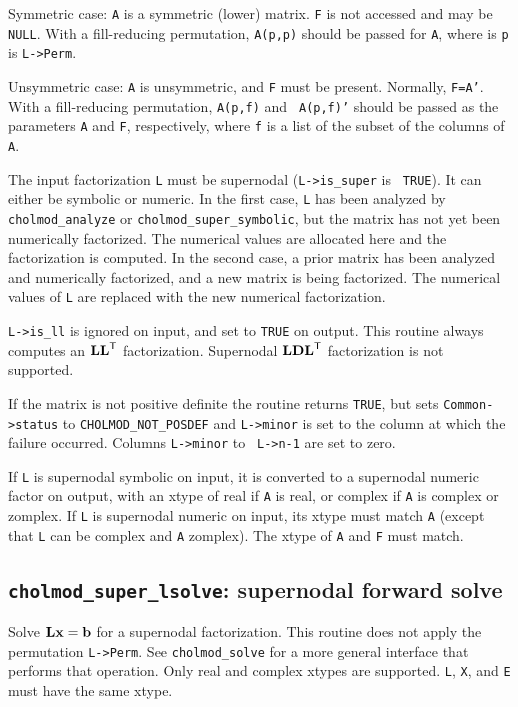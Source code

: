 \documentclass[11pt]{article}
\newcommand{\m}[1]{{\bf{#1}}}       %
\newcommand{\tr}{^{\sf T}}          %
\begin{document}
Symmetric case: {\tt A} is a symmetric (lower) matrix.  {\tt F} is not accessed
and may be {\tt NULL}.  With a fill-reducing permutation, {\tt A(p,p)} should
be passed for {\tt A}, where is {\tt p} is {\tt L->Perm}.

Unsymmetric case: {\tt A} is unsymmetric, and {\tt F} must be present.
Normally, {\tt F=A'}.  With a fill-reducing permutation, {\tt A(p,f)} and {\tt
A(p,f)'} should be passed as the parameters {\tt A} and {\tt F}, respectively,
where {\tt f} is a list of the subset of the columns of {\tt A}.

The input factorization {\tt L} must be supernodal ({\tt L->is\_super} is {\tt
TRUE}).  It can either be symbolic or numeric.  In the first case, {\tt L} has
been analyzed by {\tt cholmod\_analyze} or {\tt cholmod\_super\_symbolic}, but
the matrix has not yet been numerically factorized.  The numerical values are
allocated here and the factorization is computed.  In the second case, a prior
matrix has been analyzed and numerically factorized, and a new matrix is being
factorized.  The numerical values of {\tt L} are replaced with the new
numerical factorization.

{\tt L->is\_ll} is ignored on input, and set to {\tt TRUE} on output.  This
routine always computes an $\m{LL}\tr$ factorization.  Supernodal $\m{LDL}\tr$
factorization is not supported.

If the matrix is not positive definite the routine returns {\tt TRUE}, but sets
{\tt Common->status} to {\tt CHOLMOD\_NOT\_POSDEF} and {\tt L->minor} is set to
the column at which the failure occurred.  Columns {\tt L->minor} to {\tt
L->n-1} are set to zero.

If {\tt L} is supernodal symbolic on input, it is converted to a supernodal
numeric factor on output, with an xtype of real if {\tt A} is real, or complex
if {\tt A} is complex or zomplex.  If {\tt L} is supernodal numeric on input,
its xtype must match {\tt A} (except that {\tt L} can be complex and {\tt A}
zomplex).  The xtype of {\tt A} and {\tt F} must match.

\subsection{{\tt cholmod\_super\_lsolve}: supernodal forward solve}


Solve $\m{Lx}=\m{b}$ for a supernodal factorization.  This routine does not
apply the permutation {\tt L->Perm}.  See {\tt cholmod\_solve} for a more
general interface that performs that operation.  Only real and complex xtypes
are supported.  {\tt L}, {\tt X}, and {\tt E} must have the same xtype.
\end{document}
